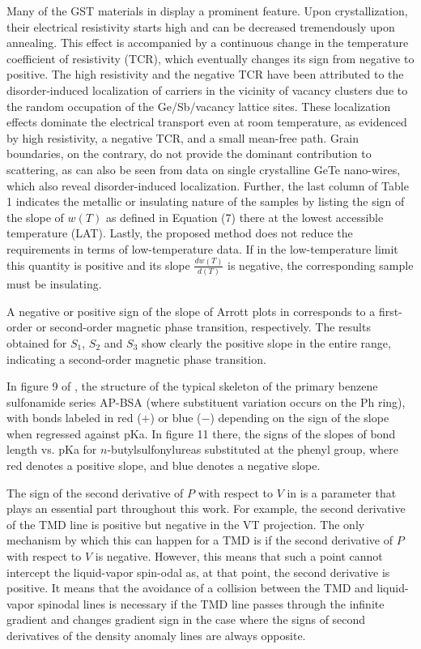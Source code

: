 \documentclass[11pt]{book}
\begin{document}
Many of the GST materials in \cite{volker2015low} display a prominent
feature. Upon crystallization, their electrical resistivity starts
high and can be decreased tremendously upon annealing. This effect
is accompanied by a continuous change in the temperature coefficient
of resistivity (TCR), which eventually changes its sign from negative
to positive. The high resistivity and the negative TCR have been attributed
to the disorder-induced localization of carriers in the vicinity of
vacancy clusters due to the random occupation of the Ge/Sb/vacancy
lattice sites. These localization effects dominate the electrical
transport even at room temperature, as evidenced by high resistivity,
a negative TCR, and a small mean-free path. Grain boundaries, on the
contrary, do not provide the dominant contribution to scattering,
as can also be seen from data on single crystalline GeTe nano-wires,
which also reveal disorder-induced localization. Further, the last
column of Table 1 indicates the metallic or insulating nature of the
samples by listing the sign of the slope of $w\left(T\right)$ as
defined in Equation (7) there at the lowest accessible temperature
(LAT). Lastly, the proposed method does not reduce the requirements
in terms of low-temperature data. If in the low-temperature limit
this quantity is positive and its slope $\frac{dw\left(T\right)}{d\left(T\right)}$
is negative, the corresponding sample must be insulating.

A negative or positive sign of the slope of Arrott plots in \cite{estemirova2018structural}
corresponds to a first-order or second-order magnetic phase transition,
respectively. The results obtained for $S_{1}$, $S_{2}$ and $S_{3}$
show clearly the positive slope in the entire range, indicating a
second-order magnetic phase transition.

In figure 9 of \cite{caine2019experiment}, the structure of the typical
skeleton of the primary benzene sulfonamide series AP-BSA (where substituent
variation occurs on the Ph ring), with bonds labeled in red ($+$)
or blue ($-$) depending on the sign of the slope when regressed against
pKa. In figure 11 there, the signs of the slopes of bond length vs.
pKa for $n$-butylsulfonylureas substituted at the phenyl group, where
red denotes a positive slope, and blue denotes a negative slope.

The sign of the second derivative of $P$ with respect to $V$ in
\cite{fijan2019interactions} is a parameter that plays an essential
part throughout this work. For example, the second derivative of the
TMD line is positive but negative in the VT projection. The only mechanism
by which this can happen for a TMD is if the second derivative of
$P$ with respect to $V$ is negative. However, this means that such
a point cannot intercept the liquid-vapor spin-odal as, at that point,
the second derivative is positive. It means that the avoidance of
a collision between the TMD and liquid-vapor spinodal lines is necessary
if the TMD line passes through the infinite gradient and changes gradient
sign in the case where the signs of second derivatives of the density
anomaly lines are always opposite.
\end{document}
